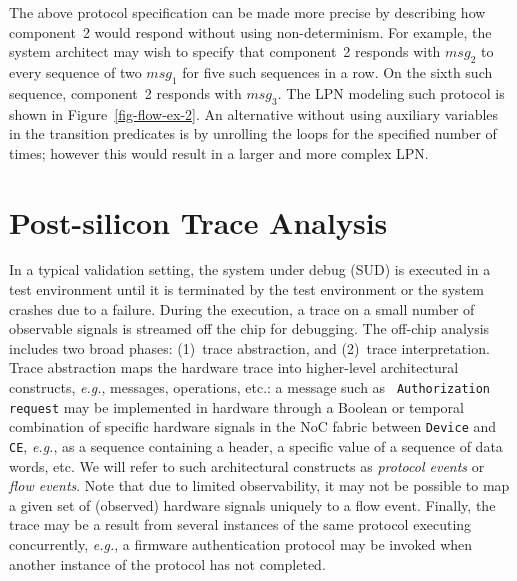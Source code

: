 \documentclass[12pt,frontmatter,copyright,thesis]{usfmanus}
\newcommand{\eg}{\mbox{{\em e.g.}}}
\begin{document}
 The above protocol specification can be made more precise by describing how component~2 would respond without using non-determinism.  For example, the system architect may wish to specify that component~2  responds with $\mathit{msg_2}$ to every sequence of two $\mathit{msg_1}$ for five such sequences in a row.  On the sixth such sequence, component~2 responds with $\mathit{msg_3}$.  The LPN modeling such protocol is shown in Figure~\ref{fig-flow-ex-2}.  An alternative without using auxiliary variables in the transition predicates is by unrolling the loops for the specified number of times; however this would result in a larger and more complex LPN.  


 
\section{Post-silicon Trace Analysis}
 In a typical validation setting, the system under debug
 (SUD) is executed in a test environment until it is
 terminated by the test environment or the system crashes
 due to a failure.  During the execution, a trace on a
 small number of observable signals is streamed off the
 chip for debugging.  
The off-chip analysis
includes two broad phases: (1)~trace abstraction, and
(2)~trace interpretation.  Trace abstraction maps the
hardware trace into higher-level architectural constructs,
\eg, messages, operations, etc.: a message such as {\tt
  Authorization request} may be implemented in hardware
through a Boolean or temporal combination of specific
hardware signals in the NoC fabric between {\tt Device} and
{\tt CE}, \eg, as a sequence containing a header, a specific
value of a sequence of data words, etc.  We will refer to
such architectural constructs as {\em protocol events} or
{\em flow events}.  Note that due to limited observability,
it may not be possible to map a given set of (observed)
hardware signals uniquely to a flow event.  Finally, the
trace may be a result from several instances of the same
protocol executing concurrently, \eg, a firmware
authentication protocol may be invoked when another instance
of the protocol has not completed.
\end{document}
